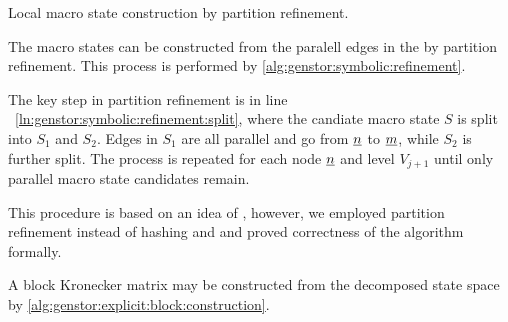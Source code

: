 \begin{algorithm}
  \caption{Local macro state construction by partition refinement.}
  \label{alg:genstor:symbolic:refinement}
\end{algorithm}

The macro states can be constructed from the paralell edges in the
 by partition refinement. This process is performed by
\vref{alg:genstor:symbolic:refinement}.

The key step in partition refinement is in line%
~\ref{ln:genstor:symbolic:refinement:split}, where the candiate macro
state $S$ is split into $S_1$ and $S_2$. Edges in $S_1$ are all
parallel and go from
$\underline{n}$ to $\underline{m}$, while $S_2$ is further split. The
process is repeated for each node $\underline{n}$ and level $V_{j + 1}$
until only parallel macro state candidates remain.

This procedure is based on an idea of \citet{buchholz2004kronecker},
however, we employed partition refinement instead of hashing and and
proved correctness of the algorithm formally.

A block Kronecker matrix may be constructed from the decomposed state
space by \cref{alg:genstor:explicit:block:construction}.

